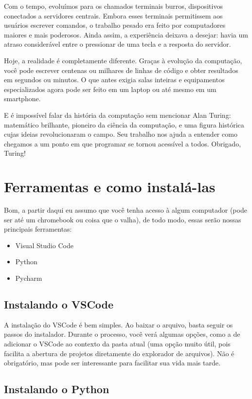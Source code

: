 \documentclass[12pt]{book}
\begin{document}
	Com o tempo, evoluímos para os chamados terminais burros, dispositivos conectados a servidores centrais. Embora esses terminais permitissem aos usuários escrever comandos, o trabalho pesado era feito por computadores maiores e mais poderosos. Ainda assim, a experiência deixava a desejar: havia um atraso considerável entre o pressionar de uma tecla e a resposta do servidor.
	
	Hoje, a realidade é completamente diferente. Graças à evolução da computação, você pode escrever centenas ou milhares de linhas de código e obter resultados em segundos ou minutos. O que antes exigia salas inteiras e equipamentos especializados agora pode ser feito em um laptop ou até mesmo em um smartphone.
	
	E é impossível falar da história da computação sem mencionar Alan Turing: matemático brilhante, pioneiro da ciência da computação, e uma figura histórica cujas ideias revolucionaram o campo. Seu trabalho nos ajuda a entender como chegamos a um ponto em que programar se tornou acessível a todos. Obrigado, Turing!
	
	\section{Ferramentas e como instalá-las}
	
	Bom, a partir daqui eu assumo que você tenha acesso à algum computador (pode ser até um chromebook ou coisa que o valha), de todo modo, essas serão nossas principais ferramentas:
	
	\begin{itemize}
		\item Visual Studio Code
		\item Python
		\item Pycharm
	\end{itemize}

	\subsection{Instalando o VSCode}
	
	A instalação do VSCode é bem simples. Ao baixar o arquivo, basta seguir os passos do instalador. Durante o processo, você verá algumas opções, como a de adicionar o VSCode ao contexto da pasta atual (uma opção muito útil, pois facilita a abertura de projetos diretamente do explorador de arquivos). Não é obrigatório, mas pode ser interessante para facilitar sua vida mais tarde.
	
	\subsection{Instalando o Python}
	
\end{document}
